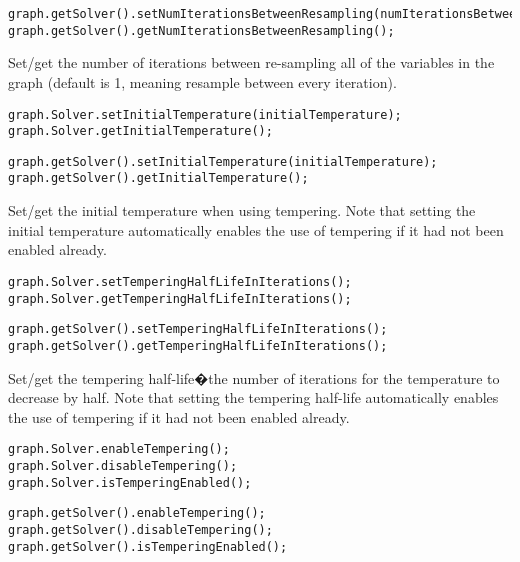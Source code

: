 \ifjava
\begin{lstlisting}
graph.getSolver().setNumIterationsBetweenResampling(numIterationsBetweenResampling);
graph.getSolver().getNumIterationsBetweenResampling();
\end{lstlisting}
\fi

Set/get the number of iterations between re-sampling all of the variables in the graph (default is 1, meaning resample between every iteration).

\ifmatlab
\begin{lstlisting}
graph.Solver.setInitialTemperature(initialTemperature);
graph.Solver.getInitialTemperature();
\end{lstlisting}
\fi

\ifjava
\begin{lstlisting}
graph.getSolver().setInitialTemperature(initialTemperature);
graph.getSolver().getInitialTemperature();
\end{lstlisting}
\fi


Set/get the initial temperature when using tempering. Note that setting the initial temperature automatically enables the use of tempering if it had not been enabled already.

\ifmatlab
\begin{lstlisting}
graph.Solver.setTemperingHalfLifeInIterations();
graph.Solver.getTemperingHalfLifeInIterations();
\end{lstlisting}
\fi

\ifjava
\begin{lstlisting}
graph.getSolver().setTemperingHalfLifeInIterations();
graph.getSolver().getTemperingHalfLifeInIterations();
\end{lstlisting}
\fi

Set/get the tempering half-life�the number of iterations for the temperature to decrease by half. Note that setting the tempering half-life automatically enables the use of tempering if it had not been enabled already.

\ifmatlab
\begin{lstlisting}
graph.Solver.enableTempering();
graph.Solver.disableTempering();
graph.Solver.isTemperingEnabled();
\end{lstlisting}
\fi

\ifjava
\begin{lstlisting}
graph.getSolver().enableTempering();
graph.getSolver().disableTempering();
graph.getSolver().isTemperingEnabled();
\end{lstlisting}
\fi

